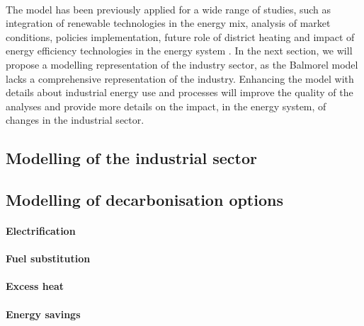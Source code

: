 \documentclass[review]{elsarticle}
\begin{document}
\\
The model has been previously applied for a wide range of studies, such as integration of renewable technologies in the energy mix, analysis of market conditions, policies implementation, future role of district heating and impact of energy efficiency technologies in the energy system \cite{Ball2007,Jensen2008,Karlsson2008,Munster2012,Munster2010,Baldini2016a}.
In the next section, we will propose a modelling representation of the industry sector, as the Balmorel model lacks a comprehensive representation of the industry. Enhancing the model with details about industrial energy use and processes will improve the quality of the analyses and provide more details on the impact, in the energy system, of changes in the industrial sector.

\subsection{Modelling of the industrial sector}

\subsection{Modelling of decarbonisation options}

\paragraph{Electrification}

\paragraph{Fuel substitution}

\paragraph{Excess heat}

\paragraph{Energy savings}
\end{document}
